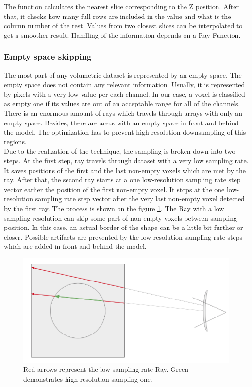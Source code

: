 \documentclass[twoside, english, 11pt]{report}
\begin{document}
The function calculates the nearest slice corresponding to the Z position. After that, it checks how many full rows are included in the value and what is the column number of the rest. Values from two closest slices can be interpolated to get a smoother result. Handling of the information depends on a Ray Function.\\

\subsubsection{Empty space skipping}

The most part of any volumetric dataset is represented by an empty space. The empty space does not contain any relevant information. Usually, it is represented by pixels with a very low value per each channel. In our case, a voxel is classified as empty one if its values are out of an acceptable range for all of the channels. There is an enormous amount of rays which travels through arrays with only an empty space. Besides, there are areas with an empty space in front and behind the model. The optimization has to prevent high-resolution downsampling of this regions.\\

Due to the realization of the technique, the sampling is broken down into two steps. At the first step, ray travels through dataset with a very low sampling rate. It saves positions of the first and the last non-empty voxels which are met by the ray. After that, the second ray starts at a one low-resolution sampling rate step vector earlier the position of the first non-empty voxel. It stops at the one low-resolution sampling rate step vector after the very last non-empty voxel detected by the first ray. The process is shown on the figure \ref{fig:empty}. The Ray with a low sampling resolution can skip some part of non-empty voxels between sampling position. In this case, an actual border of the shape can be a little bit further or closer.  Possible artifacts are prevented by the low-resolution sampling rate steps which are added in front and behind the model.\\

\begin{figure}[!h]
\centerline{\includegraphics[scale = 0.4]{img/empty}}
\caption{Red arrows represent the low sampling rate Ray. Green demonstrates high resolution sampling one.\label{fig:empty}}
\end{figure}
\end{document}

